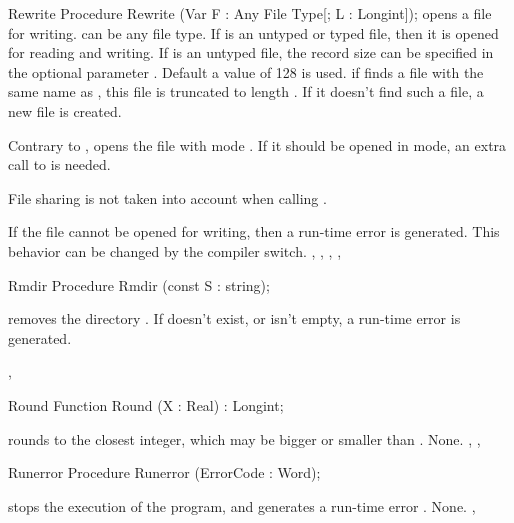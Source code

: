 \begin{procedure}{Rewrite}
\Declaration
Procedure Rewrite (Var F : Any File Type[; L : Longint]);
\Description
{} opens a file  for writing.  can be any file type.
If  is an untyped or typed file, then it is opened for reading and
writing. If  is an untyped file, the record size can be specified in
the optional parameter . Default a value of 128 is used.
if  finds a file with the same name as , this file is
truncated to length . If it doesn't find such a file, a new file is
created.

Contrary to \tp, \fpc opens the file with mode . If it should
be opened in  mode, an extra call to  is needed.

File sharing is not taken into account when calling .

\Errors
If the file cannot be opened for writing, then a run-time error is
generated. This behavior can be changed by the  compiler switch.
\SeeAlso
{}, , , , 
\end{procedure}


\begin{procedure}{Rmdir}
\Declaration
Procedure Rmdir (const S : string);

\Description
{} removes the directory .
\Errors
If  doesn't exist, or isn't empty, a run-time error is generated.

\SeeAlso
{}, 
\end{procedure}


\begin{function}{Round}
\Declaration
Function Round (X : Real) : Longint;

\Description
{} rounds  to the closest integer, which may be bigger or
smaller than .
\Errors
None.
\SeeAlso
{}, , 
\end{function}


\begin{procedure}{Runerror}
\Declaration
Procedure Runerror (ErrorCode : Word);

\Description
{} stops the execution of the program, and generates a
run-time error .
\Errors
None.
\SeeAlso
{}, 
\end{procedure}

